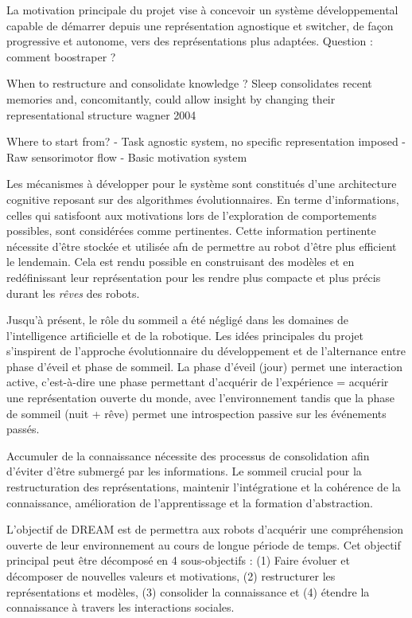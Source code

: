 \documentclass[draft]{llncs}
\begin{document}
La motivation principale du projet vise à concevoir un système développemental capable de démarrer depuis une représentation agnostique et switcher, de façon progressive et autonome, vers des représentations plus adaptées. Question : comment boostraper ?


When to restructure and consolidate knowledge ?
Sleep consolidates recent memories and, concomitantly, could allow insight by changing their representational structure wagner 2004


Where to start from?
- Task agnostic system, no specific representation imposed
- Raw sensorimotor flow
- Basic motivation system

Les mécanismes à développer pour le système sont constitués d'une architecture cognitive reposant sur des algorithmes évolutionnaires. 
En terme d'informations, celles qui satisfoont aux motivations lors de l'exploration de comportements possibles, sont considérées comme pertinentes.
Cette information pertinente nécessite d'être stockée et utilisée afn de permettre au robot d'être plus efficient le lendemain.
Cela est rendu possible en construisant des modèles et en redéfinissant leur représentation pour les rendre plus compacte et plus précis durant les \textit{rêves} des robots.

Jusqu'à présent, le rôle du sommeil a été négligé dans les domaines de l'intelligence artificielle et de la robotique.
Les idées principales du projet s'inspirent de l'approche évolutionnaire du développement et de l'alternance entre phase d'éveil et phase de sommeil.
La phase d'éveil (jour) permet une interaction active, c'est-à-dire une phase permettant d'acquérir de l'expérience = acquérir une représentation ouverte du monde, avec l'environnement 
tandis que la phase de sommeil (nuit + rêve) permet une introspection passive sur les événements passés.

Accumuler de la connaissance nécessite des processus de consolidation afin d'éviter d'être submergé par les informations.
Le sommeil crucial pour la restructuration des représentations, maintenir l'intégratione et la cohérence de la connaissance, amélioration de l'apprentissage et la formation d'abstraction.

L'objectif de DREAM est de permettra aux robots d'acquérir une compréhension ouverte de leur environnement au cours de longue période de temps.
Cet objectif principal peut être décomposé en 4 sous-objectifs : (1) Faire évoluer et décomposer de nouvelles valeurs et motivations, (2) restructurer les représentations et modèles, (3) consolider la connaissance et (4) étendre la connaissance à travers les interactions sociales.
\end{document}
